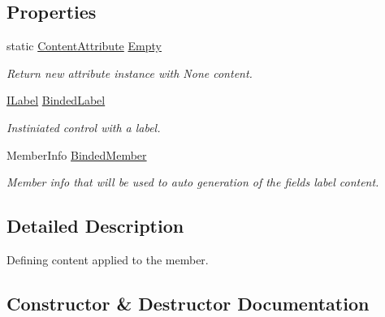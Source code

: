 \subsection*{Properties}
\begin{DoxyCompactItemize}
\item 
static \mbox{\hyperlink{class_wpf_handler_1_1_u_i_1_1_auto_layout_1_1_configuration_1_1_content_attribute}{Content\+Attribute}} \mbox{\hyperlink{class_wpf_handler_1_1_u_i_1_1_auto_layout_1_1_configuration_1_1_content_attribute_a7342c312b16ecde3884a20ae56879485}{Empty}}
\begin{DoxyCompactList}\small\item\em Return new attribute instance with None content. \end{DoxyCompactList}\item 
\mbox{\hyperlink{interface_wpf_handler_1_1_u_i_1_1_controls_1_1_i_label}{I\+Label}} \mbox{\hyperlink{class_wpf_handler_1_1_u_i_1_1_auto_layout_1_1_configuration_1_1_content_attribute_a27ac4fe8d5fdf953c624a099b7c33ac4}{Binded\+Label}}
\begin{DoxyCompactList}\small\item\em Instiniated control with a label. \end{DoxyCompactList}\item 
Member\+Info \mbox{\hyperlink{class_wpf_handler_1_1_u_i_1_1_auto_layout_1_1_configuration_1_1_content_attribute_ac04878f4eb3c6ceb3c3f5c726fc34d50}{Binded\+Member}}
\begin{DoxyCompactList}\small\item\em Member info that will be used to auto generation of the field\textquotesingle{}s label content. \end{DoxyCompactList}\end{DoxyCompactItemize}


\subsection{Detailed Description}
Defining content applied to the member. 



\subsection{Constructor \& Destructor Documentation}
\mbox{\label{class_wpf_handler_1_1_u_i_1_1_auto_layout_1_1_configuration_1_1_content_attribute_acdfac4309551dd388a4f039b9e9263dc}} 
